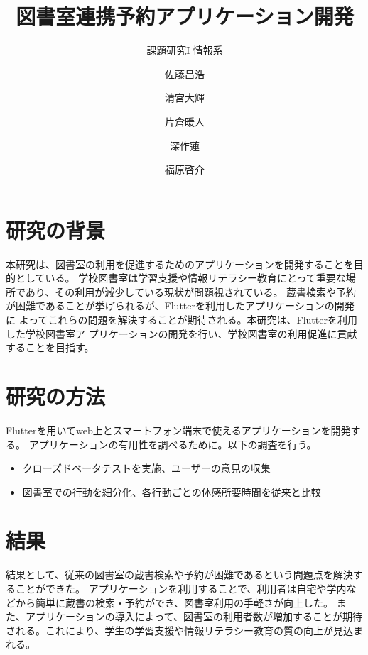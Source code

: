 \documentclass[pdflatex,ja=standard,twocolumn]{bxjsarticle}
\begin{document}
\title{図書室連携予約アプリケーション開発}
\author{課題研究I 情報系\and 佐藤昌浩 \and 清宮大輝 \and 片倉暖人 \and 深作蓮 \and 福原啓介}
\date{\vspace{-10mm}}


\section{研究の背景}
本研究は、図書室の利用を促進するためのアプリケーションを開発することを目的としている。
学校図書室は学習支援や情報リテラシー教育にとって重要な場所であり、その利用が減少している現状が問題視されている。
蔵書検索や予約が困難であることが挙げられるが、Flutterを利用したアプリケーションの開発に
よってこれらの問題を解決することが期待される。本研究は、Flutterを利用した学校図書室ア
プリケーションの開発を行い、学校図書室の利用促進に貢献することを目指す。
\section{研究の方法}
Flutterを用いてweb上とスマートフォン端末で使えるアプリケーションを開発する。
アプリケーションの有用性を調べるために。以下の調査を行う。
\begin{itemize}
  \item クローズドベータテストを実施、ユーザーの意見の収集
  \item 図書室での行動を細分化、各行動ごとの体感所要時間を従来と比較
\end{itemize}
\section{結果}
結果として、従来の図書室の蔵書検索や予約が困難であるという問題点を解決することができた。
アプリケーションを利用することで、利用者は自宅や学内などから簡単に蔵書の検索・予約ができ、図書室利用の手軽さが向上した。
また、アプリケーションの導入によって、図書室の利用者数が増加することが期待される。これにより、学生の学習支援や情報リテラシー教育の質の向上が見込まれる。
\end{document}
